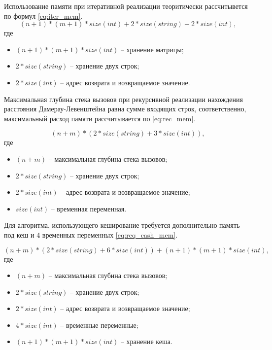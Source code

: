 Использование памяти при итеративной реализации теоритически рассчитывется по формул \eqref{eq:iter_mem}.
\begin{equation}
	\label{eq:iter_mem}
	(n + 1) * (m + 1) * size(int) + 2 * size(string) + 2 * size(int),
\end{equation}
где 
\begin{itemize}
	\item $ (n + 1) * (m + 1) * size(int) $ -- хранение матрицы;
	\item $ 2 * size(string) $ -- хранение двух строк;
	\item $ 2 * size(int) $ -- адрес возврата и возвращаемое значение.
\end{itemize}


Максимальная глубина стека вызовов при рекурсивной реализации
нахождения расстояния Дамерау-Левенштейна равна сумме входящих строк,
соответственно, максимальный расход памяти рассчитывается по \eqref{eq:rec_mem}.

\begin{equation}
	\label{eq:rec_mem}
	(n + m) * (2 * size(string) + 3 * size(int)),
\end{equation}
где 
\begin{itemize}
	\item $ (n + m) $ -- максимальная глубина стека вызовов;
	\item $ 2 * size(string) $ -- хранение двух строк;
	\item $ 2 * size(int) $ -- адрес возврата и возвращаемое значение;
	\item $ size(int) $ -- временная переменная.
\end{itemize}

Для алгоритма, использующего кеширование требуется дополнительно память под кеш и 4 временных переменных \eqref{eq:req_cash_mem}.

\begin{equation}
	\label{eq:req_cash_mem}
	(n + m) * (2 * size(string) + 6 * size(int)) + (n + 1) * (m + 1) * size(int),
\end{equation}
где 
\begin{itemize}
	\item $ (n + m) $ -- максимальная глубина стека вызовов;
	\item $ 2 * size(string) $ -- хранение двух строк;
	\item $ 2 * size(int) $ -- адрес возврата и возвращаемое значение;
	\item $ 4 * size(int) $ -- временные переменные;
	\item $ (n + 1) * (m + 1) * size(int) $ -- хранение кеша.
\end{itemize}

